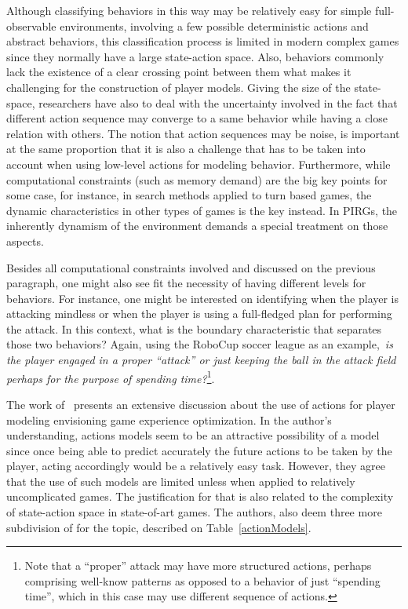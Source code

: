 Although classifying behaviors in this way may be relatively easy for simple full-observable environments, involving a few possible deterministic actions and abstract behaviors, this classification process is limited in modern complex games since they normally have a large state-action space. Also, behaviors commonly lack the existence of a clear crossing point between them what makes it challenging for the construction of player models. Giving the size of the state-space, researchers have also to deal with the uncertainty involved in the fact that different action sequence may converge to a same behavior while having a close relation with others. The notion that action sequences may be noise, is important at the same proportion that it is also a challenge that has to be taken into account when using low-level actions for modeling behavior.  Furthermore, while computational constraints (such as memory demand) are the big key points for some case, for instance, in search methods applied to turn based games, the dynamic characteristics in other types of games is the key instead. In PIRGs, the inherently dynamism of the environment demands a special treatment on those aspects.

Besides all computational constraints involved and discussed on the previous paragraph, one might also see fit the necessity of having different levels for behaviors. For instance, one might be interested on identifying when the player is attacking mindless or when the player is using a full-fledged plan for performing the attack. In this context, what is the boundary characteristic that separates those two behaviors? Again, using the RoboCup soccer league as an example,~\textit{is the player engaged in a proper ``attack'' or just keeping the ball in the attack field perhaps for the purpose of spending time?}\footnote{Note that a ``proper'' attack may have more structured actions, perhaps comprising well-know patterns as opposed to a behavior of just ``spending time'', which in this case may use different sequence of actions.}.

The work of~\cite{bakkes2012player} presents an extensive discussion about the use of actions for player modeling envisioning game experience optimization. In the author's understanding, actions models seem to be an attractive possibility of a model since once being able to predict accurately the future actions to be taken by the player, acting accordingly would be a relatively easy task. However, they agree that the use of such models are limited unless when applied to relatively uncomplicated games. The justification for that is also related to the complexity of state-action space in state-of-art games. The authors, also deem three more subdivision of for the topic, described on Table~\ref{actionModels}.

